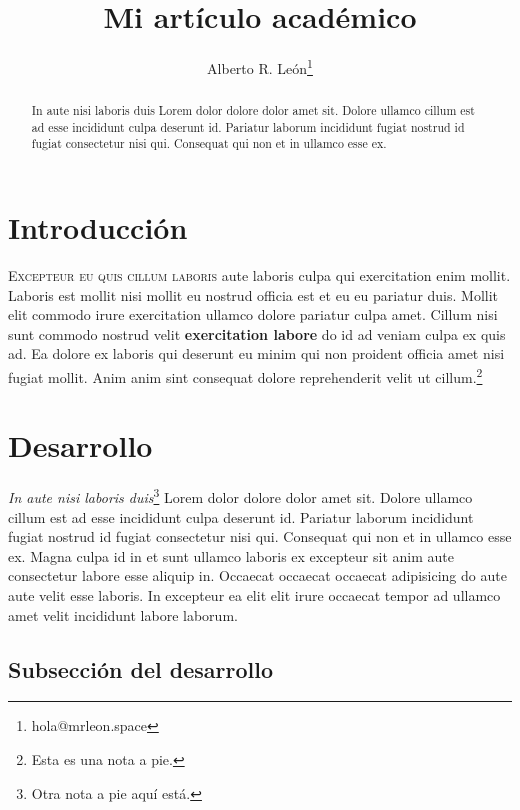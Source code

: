 \documentclass[11pt,letterpaper]{article}
\author[a]{Alberto R. León\thanks{hola@mrleon.space}}
\affil[a]{Universidad Autónoma de la Ciudad de México, Plantel Del Valle, México.}
\title{Mi artículo académico}
\begin{document}
  \maketitle

  \begin{abstract}

      In aute nisi laboris duis Lorem dolor dolore dolor amet sit. Dolore ullamco cillum est ad esse incididunt culpa deserunt id. Pariatur laborum incididunt fugiat nostrud id fugiat consectetur nisi qui. Consequat qui non et in ullamco esse ex. 
  \end{abstract}



  \section{Introducción}


    \textsc{Excepteur eu quis cillum laboris} aute laboris culpa qui exercitation enim mollit. Laboris est mollit nisi mollit eu nostrud officia est et eu eu pariatur duis. Mollit elit commodo irure exercitation \footnotesize ullamco dolore pariatur \normalsize culpa amet. Cillum nisi sunt commodo nostrud velit \textbf{exercitation labore} do id ad veniam culpa ex quis ad. Ea dolore ex laboris qui deserunt \tiny eu minim qui non proident officia amet nisi fugiat mollit. \normalsize Anim anim sint consequat dolore reprehenderit velit ut cillum.\footnote{Esta es una nota a pie.}

  \section{\huge Desarrollo}

    \emph{In aute nisi laboris duis}\footnote{Otra nota a pie aquí está.} Lorem dolor dolore dolor amet sit. Dolore ullamco cillum est ad esse incididunt culpa deserunt id. Pariatur laborum incididunt fugiat nostrud id fugiat consectetur nisi qui. Consequat qui non et in ullamco esse ex. Magna culpa id in et sunt ullamco laboris ex excepteur sit anim aute consectetur labore esse aliquip in. Occaecat occaecat occaecat adipisicing do aute aute velit esse laboris. In excepteur ea elit elit irure occaecat tempor ad ullamco amet velit incididunt labore laborum.
    
    \subsection{Subsección del desarrollo}
    
\end{document}
